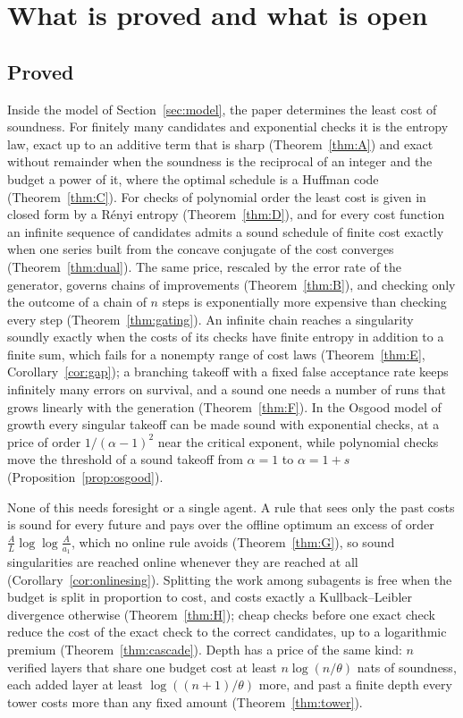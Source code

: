 \section{What is proved and what is open}\label{sec:status}

\subsection{Proved}

Inside the model of Section~\ref{sec:model}, the paper determines the least cost of soundness. For finitely many candidates and exponential checks it is the entropy law, exact up to an additive term that is sharp (Theorem~\ref{thm:A}) and exact without remainder when the soundness is the reciprocal of an integer and the budget a power of it, where the optimal schedule is a Huffman code (Theorem~\ref{thm:C}). For checks of polynomial order the least cost is given in closed form by a R\'enyi entropy (Theorem~\ref{thm:D}), and for every cost function an infinite sequence of candidates admits a sound schedule of finite cost exactly when one series built from the concave conjugate of the cost converges (Theorem~\ref{thm:dual}). The same price, rescaled by the error rate of the generator, governs chains of improvements (Theorem~\ref{thm:B}), and checking only the outcome of a chain of $n$ steps is exponentially more expensive than checking every step (Theorem~\ref{thm:gating}). An infinite chain reaches a singularity soundly exactly when the costs of its checks have finite entropy in addition to a finite sum, which fails for a nonempty range of cost laws (Theorem~\ref{thm:E}, Corollary~\ref{cor:gap}); a branching takeoff with a fixed false acceptance rate keeps infinitely many errors on survival, and a sound one needs a number of runs that grows linearly with the generation (Theorem~\ref{thm:F}). In the Osgood model of growth every singular takeoff can be made sound with exponential checks, at a price of order $1/(\alpha-1)^{2}$ near the critical exponent, while polynomial checks move the threshold of a sound takeoff from $\alpha=1$ to $\alpha=1+s$ (Proposition~\ref{prop:osgood}).

None of this needs foresight or a single agent. A rule that sees only the past costs is sound for every future and pays over the offline optimum an excess of order $\frac{A}{L}\log\log\frac{A}{a_{1}}$, which no online rule avoids (Theorem~\ref{thm:G}), so sound singularities are reached online whenever they are reached at all (Corollary~\ref{cor:onlinesing}). Splitting the work among subagents is free when the budget is split in proportion to cost, and costs exactly a Kullback--Leibler divergence otherwise (Theorem~\ref{thm:H}); cheap checks before one exact check reduce the cost of the exact check to the correct candidates, up to a logarithmic premium (Theorem~\ref{thm:cascade}). Depth has a price of the same kind: $n$ verified layers that share one budget cost at least $n\log(n/\theta)$ nats of soundness, each added layer at least $\log((n+1)/\theta)$ more, and past a finite depth every tower costs more than any fixed amount (Theorem~\ref{thm:tower}).

